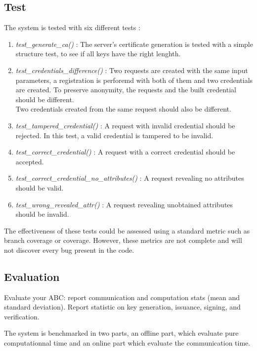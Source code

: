 \documentclass[10pt,conference,compsocconf]{IEEEtran}
\begin{document}
\subsection{Test}
The system is tested with six different tests : 
\begin{enumerate}
    \item \textit{test\_generate\_ca()} : The server's certificate generation is tested with a simple structure test, to see if all keys have the right lenghth.
    \item \textit{test\_credentials\_difference()} : Two requests are created with the same input parameters, a registration is perforemd with both of them and two credentials are created. To preserve anonymity, the requests and the built credential should be different. \\ Two credentials created from the same request should also be different.
    \item \textit{test\_tampered\_credential()} : A request with invalid credential should be rejected. In this test, a valid credential is tampered to be invalid.
    \item \textit{test\_correct\_credential()} : A request with a correct credential should be accepted.
    \item \textit{test\_correct\_credential\_no\_attributes()} : A request revealing no attributes should be valid.
    \item \textit{test\_wrong\_revealed\_attr()} : A request revealing unobtained attributes should be invalid.
\end{enumerate}
The effectiveness of these tests could be assessed using a standard metric such as branch coverage or coverage. However, these metrics are not complete and will not discover every bug present in the code.


\subsection{Evaluation}
Evaluate your ABC: report communication and computation stats (mean and standard
deviation). Report statistic on key generation, issuance, signing, and
verification.

The system is benchmarked in two parts, an offline part, which evaluate pure computationnal time and an online part which evaluate the communication time.
\end{document}
